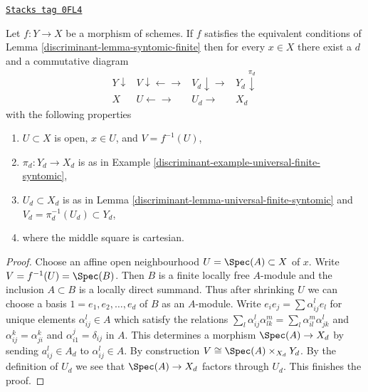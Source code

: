 \begin{lemma}
\label{discriminant-lemma-locally-comes-from-universal-finite}
\href{https://stacks.math.columbia.edu/tag/0FL4}{\texttt{Stacks tag 0FL4}}

Let $f : Y \to X$ be a morphism of schemes. If $f$ satisfies the equivalent
conditions of Lemma \ref{discriminant-lemma-syntomic-finite} then for every
$x \in X$ there exist a $d$ and a commutative diagram
$$
\begin{array}{cccc}Y \downarrow & V \downarrow\longleftarrow\longrightarrow & V_d \downarrow\longrightarrow & Y_d \overset{\pi_d}{\downarrow} \\ X & U \longleftarrow\longrightarrow & U_d \longrightarrow & X_d\end{array}
$$
with the following properties
\begin{enumerate}
\item $U \subset X$ is open, $x \in U$, and $V = f^{-1}(U)$,
\item $\pi_d : Y_d \to X_d$ is as in
Example \ref{discriminant-example-universal-finite-syntomic},
\item $U_d \subset X_d$ is as in Lemma \ref{discriminant-lemma-universal-finite-syntomic}
and $V_d = \pi_d^{-1}(U_d) \subset Y_d$,
\item where the middle square is cartesian.
\end{enumerate}
\end{lemma}

\begin{proof}
Choose an affine open neighbourhood $U = \Spec(A) \subset X$ of $x$.
Write $V = f^{-1}(U) = \Spec(B)$. Then $B$ is a finite locally free
$A$-module and the inclusion $A \subset B$ is a locally direct summand.
Thus after shrinking $U$ we can choose a basis $1 = e_1, e_2, \ldots, e_d$
of $B$ as an $A$-module. Write
$e_i e_j = \sum \alpha_{ij}^l e_l$ for unique
elements $\alpha_{ij}^l \in A$ which satisfy the relations
$\sum_l \alpha_{ij}^l \alpha_{lk}^m = \sum_l \alpha_{il}^m \alpha _{jk}^l$
and $\alpha_{ij}^k = \alpha_{ji}^k$ and $\alpha_{i1}^j = \delta_{ij}$
in $A$. This determines a morphism $\Spec(A) \to X_d$ by sending
$a_{ij}^l \in A_d$ to $\alpha_{ij}^l \in A$. By construction
$V \cong \Spec(A) \times_{X_d} Y_d$. By the definition of $U_d$
we see that $\Spec(A) \to X_d$ factors through $U_d$. This
finishes the proof.
\end{proof}

